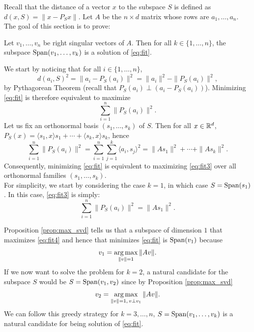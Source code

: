 \documentclass[11pt,nocut]{article}
\begin{document}
Recall that the distance of a vector $x$ to the subspace $S$ is defined as $d(x,S) = \|x - P_S x\|$.
Let $A$ be the $n \times d$ matrix whose rows are $a_1, \dots, a_n$.
The goal of this section is to prove:
\begin{theorem}\label{th:approx_svd}
	Let $v_1, \dots, v_n$ be right singular vectors of $A$. Then for all $k \in \{1, \dots, n\}$, the subspace ${{\rm Span}}(v_1, \dots, v_k)$ is a solution of \eqref{eq:fit}.
\end{theorem}
We start by noticing that for all $i \in \{1, \dots, n\}$,
$$
d(a_i, S)^2 = \| a_i - P_{S}(a_i) \|^2 = \|a_i\|^2 - \| P_{S}(a_i) \|^2,
$$
by Pythagorean Theorem (recall that $P_{S}(a_i) \perp (a_i - P_S(a_i))$). 
Minimizing \eqref{eq:fit} is therefore equivalent to maximize
\begin{equation}\label{eq:fit2}
	\sum_{i=1}^n \| P_{S}(a_i) \|^2.
\end{equation}
Let us fix an orthonormal basis $(s_1, \dots, s_k)$ of $S$. Then for all $x \in \mathbb{R}^d$,
$P_S(x)= \langle s_1, x \rangle s_1 + \cdots + \langle s_k, x \rangle s_k$, hence
\begin{equation}\label{eq:fit3}
	\sum_{i=1}^n \| P_{S}(a_i) \|^2 = \sum_{i=1}^n \sum_{j = 1}^k \langle a_i, s_j \rangle^2
	= \| A s_1 \|^2 + \cdots + \| A s_k \|^2.
\end{equation}
Consequently, minimizing \eqref{eq:fit} is equivalent to maximizing \eqref{eq:fit3} over all orthonormal families $(s_1, \dots, s_k)$.
\\

For simplicity, we start by considering the case $k=1$, in which case $S = {{\rm Span}}(s_1)$.
In this case, \eqref{eq:fit3} is simply:
\begin{equation}\label{eq:fit4}
	\sum_{i=1}^n \| P_{S}(a_i) \|^2 
	= \| A s_1 \|^2.
\end{equation}

Proposition \ref{prop:max_svd} tells us that a subspace of dimension $1$ that maximizes \eqref{eq:fit4} and hence that minimizes \eqref{eq:fit} is ${{\rm Span}}(v_1)$ because
\begin{equation}\label{eq:def_first_singular}
	v_1 = \operatorname*{arg\,max}_{\|v\| = 1} \|A v\|.
\end{equation}
If we now want to solve the problem for $k=2$, a natural candidate for the subspace $S$ would be $S = {{\rm Span}}(v_1, v_2)$ since by Proposition \ref{prop:max_svd}
\begin{equation}\label{eq:def_second_singular}
	v_2 = \operatorname*{arg\,max}_{\|v\| = 1, \, v \perp v_1} \| A v \|.
\end{equation}
We can follow this greedy strategy for $k = 3, \dots, n$, $S = {{\rm Span}}(v_1, \dots, v_k)$ is a natural candidate for being solution of \eqref{eq:fit}.
\end{document}
